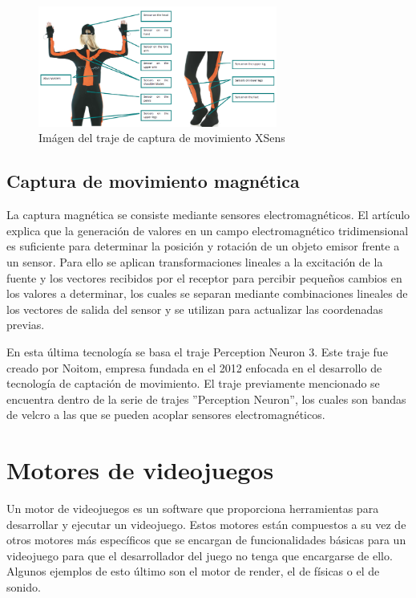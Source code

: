 \begin{figure}[H]
    \centering
    \includegraphics[width=0.7\textwidth]{Imagenes/Bitmap/XSens.png}
    \caption[Imágen del traje de captura de movimiento XSens]{Imágen del traje de captura de movimiento XSens \footnotemark }
    \label{fig:XSensTraje}
\end{figure}


\subsection{Captura de movimiento magnética}
La captura magnética se consiste mediante sensores electromagnéticos.
El artículo \cite{EMS} explica que la generación de valores en un campo electromagnético tridimensional es suficiente para determinar la posición y rotación de un objeto emisor frente a un sensor.
Para ello se aplican transformaciones lineales a la excitación de la fuente y los vectores recibidos por el receptor para percibir pequeños cambios en los valores a determinar, los cuales se separan mediante combinaciones lineales de los vectores de salida del sensor y se utilizan para actualizar las coordenadas previas.

En esta última tecnología se basa el traje Perception Neuron 3.
Este traje fue creado por Noitom, empresa fundada en el 2012 enfocada en el desarrollo de tecnología de captación de movimiento.
El traje previamente mencionado se encuentra dentro de la serie de trajes ''Perception Neuron'', los cuales son bandas de velcro a las que se pueden acoplar sensores electromagnéticos.

\section{Motores de videojuegos}
Un motor de videojuegos es un software que proporciona herramientas para desarrollar y ejecutar un videojuego.
Estos motores están compuestos a su vez de otros motores más específicos que se encargan de funcionalidades básicas para un videojuego para que el desarrollador del juego no tenga que encargarse de ello. Algunos ejemplos de esto último son el motor de render, el de físicas o el de sonido.

